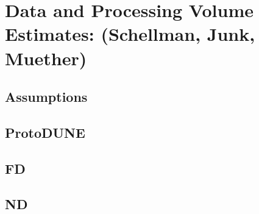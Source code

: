 \chapter{Data and Processing Volume Estimates: (Schellman, Junk, Muether)}
\label{ch:est}

\section{Assumptions}
\label{sec:est:assume}  %

\section{ProtoDUNE}
\label{sec:est:ProtoDUNE}  

\section{FD}
\label{sec:est:FD}  

\section{ND}
\label{sec:est:ND}  
